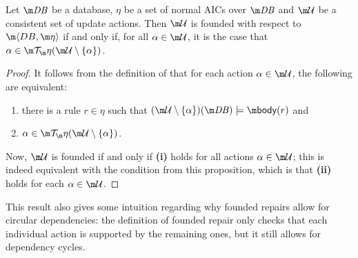 \begin{proposition}
  \label{prop:founded-char}
  Let $\db$ be a database, $\eta$ be a set of normal AICs over $\db$ and $\UU$ be a consistent set of update actions.
  Then $\UU$ is founded with respect to $\fulldb$ if and only if, for all $\alpha\in\UU$, it is the case that $\alpha\in\Op(\UU\setminus\{\alpha\})$.
\end{proposition}
\begin{proof}
  It follows from the definition of \Op that for each action $\alpha\in \UU$, the following are equivalent:
  \begin{enumerate}
   \item there is a rule $r\in\eta$ such that $(\UU\setminus\{\alpha\})(\db)\models\body(r)$ and 
   \item $\alpha\in\Op(\UU\setminus\{\alpha\})$.
  \end{enumerate}
  Now, $\UU$ is founded if and only if \textbf{(i)} holds for all actions $\alpha\in \UU$; this is indeed equivalent with the condition from this proposition, which is that \textbf{(ii)} holds for each $\alpha\in \UU$. 
\end{proof} 

This result also gives some intuition regarding why founded repairs allow for circular dependencies: the definition of founded repair only checks that each individual action is supported by the remaining ones, but it still allows for dependency cycles.

